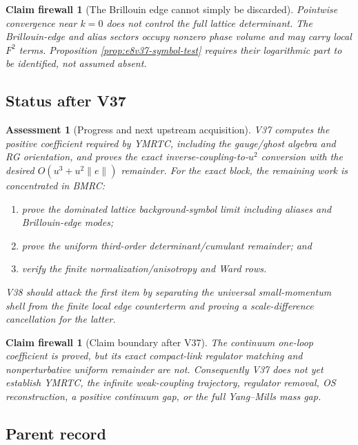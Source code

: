 \documentclass[11pt,oneside]{book}
\newtheorem{assessment}[theorem]{Assessment}
\newtheorem{firewall}[theorem]{Claim firewall}
\theoremstyle{definition}
\theoremstyle{remark}
\begin{document}
\begin{firewall}[The Brillouin edge cannot simply be discarded]
\label{fire:e8v37-edge}
Pointwise convergence near \(k=0\) does not control the full lattice
determinant.  The Brillouin-edge and alias sectors occupy nonzero
phase volume and may carry local \(F^2\) terms.  Proposition
\ref{prop:e8v37-symbol-test} requires their logarithmic part to be
identified, not assumed absent.
\end{firewall}

\subsection{Status after V37}

\begin{assessment}[Progress and next upstream acquisition]
\label{ass:e8v37-status}
V37 computes the positive coefficient required by YMRTC, including
the gauge/ghost algebra and RG orientation, and proves the exact
inverse-coupling-to-\(u^2\) conversion with the desired
\(O(u^3+u^2\|e\|)\) remainder.  For the exact block, the remaining
work is concentrated in BMRC:
\begin{enumerate}
\item prove the dominated lattice background-symbol limit including
      aliases and Brillouin-edge modes;
\item prove the uniform third-order determinant/cumulant remainder;
      and
\item verify the finite normalization/anisotropy and Ward rows.
\end{enumerate}
V38 should attack the first item by separating the universal
small-momentum shell from the finite local edge counterterm and
proving a scale-difference cancellation for the latter.
\end{assessment}

\begin{firewall}[Claim boundary after V37]
\label{fire:e8v37-claim}
The continuum one-loop coefficient is proved, but its exact
compact-link regulator matching and nonperturbative uniform
remainder are not.  Consequently V37 does not yet establish YMRTC,
the infinite weak-coupling trajectory, regulator removal, OS
reconstruction, a positive continuum gap, or the full Yang--Mills
mass gap.
\end{firewall}

\subsection{Parent record}
\end{document}
